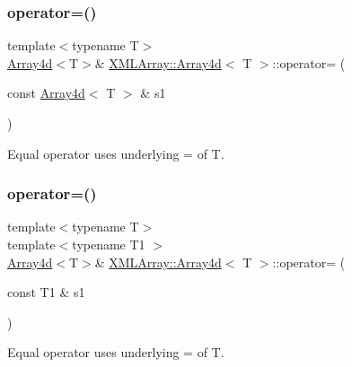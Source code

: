\subsubsection{\texorpdfstring{operator=()}{operator=()}\hspace{0.1cm}{\footnotesize\ttfamily [2/4]}}
{\footnotesize\ttfamily template$<$typename T$>$ \\
\mbox{\hyperlink{classXMLArray_1_1Array4d}{Array4d}}$<$T$>$\& \mbox{\hyperlink{classXMLArray_1_1Array4d}{X\+M\+L\+Array\+::\+Array4d}}$<$ T $>$\+::operator= (\begin{DoxyParamCaption}\item[{const \mbox{\hyperlink{classXMLArray_1_1Array4d}{Array4d}}$<$ T $>$ \&}]{s1 }\end{DoxyParamCaption})\hspace{0.3cm}{\ttfamily [inline]}}



Equal operator uses underlying = of T. 

\mbox{\label{classXMLArray_1_1Array4d_a15b8c36a1edd1f72a12301798e0810b5}} 
\subsubsection{\texorpdfstring{operator=()}{operator=()}\hspace{0.1cm}{\footnotesize\ttfamily [3/4]}}
{\footnotesize\ttfamily template$<$typename T$>$ \\
template$<$typename T1 $>$ \\
\mbox{\hyperlink{classXMLArray_1_1Array4d}{Array4d}}$<$T$>$\& \mbox{\hyperlink{classXMLArray_1_1Array4d}{X\+M\+L\+Array\+::\+Array4d}}$<$ T $>$\+::operator= (\begin{DoxyParamCaption}\item[{const T1 \&}]{s1 }\end{DoxyParamCaption})\hspace{0.3cm}{\ttfamily [inline]}}



Equal operator uses underlying = of T. 

\mbox{\label{classXMLArray_1_1Array4d_a15b8c36a1edd1f72a12301798e0810b5}} 

